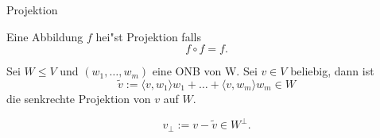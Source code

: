 \documentclass[class=article, crop=false]{standalone}
\begin{document}
\begin{zettel}{Projektion}
\begin{flashcard}
\begin{definition}[Projektion]
    Eine Abbildung $f$ hei"st Projektion falls
\[
f \circ f = f
.\]
\end{definition}
\end{flashcard}

\begin{definition}
    Sei $W \leq  V$  und $( w_1,\dots,w_m)$ eine ONB von W. Sei $v \in V$ beliebig, dann ist 
\[
\tilde{v} := \langle v,w_1\rangle w_1 + \dots + \langle v,w_m\rangle w_m \in  W
\]
die senkrechte Projektion von $v$  auf $W$.

\end{definition}

\begin{lemma}
\[
    v_{\perp} := v - \tilde{v} \in  W^{\perp}
.\]
\end{lemma}
\end{zettel}
\end{document}
